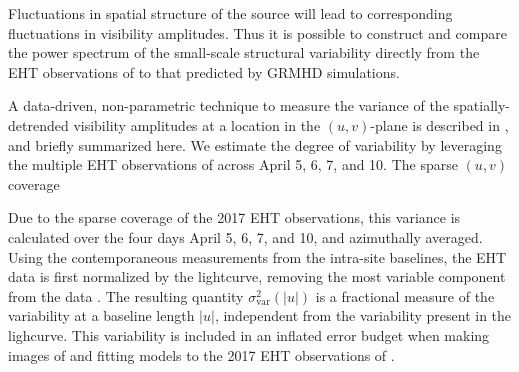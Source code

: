 

Fluctuations in spatial structure of the source will lead to corresponding fluctuations in visibility amplitudes. Thus it is possible to construct and compare the power spectrum of the small-scale structural variability directly from the EHT observations of \sgra to that predicted by GRMHD simulations.

A data-driven, non-parametric technique to measure the variance of the spatially-detrended visibility amplitudes at a location in the $(u,v)$-plane is described in \citet{NoiseModeling}, and briefly summarized here.  We estimate the degree of variability by leveraging the multiple EHT observations of \sgra across April 5, 6, 7, and 10.  The sparse $(u,v)$ coverage 

Due to the sparse coverage of the 2017 EHT observations, this variance is calculated over the four days April 5, 6, 7, and 10, and azimuthally averaged. Using the contemporaneous measurements from the intra-site baselines, the EHT data is first normalized by the lightcurve, removing the most variable component from the data \citep{NoiseModeling,Georgiev_2022}. The resulting quantity $\sigma_\text{var}^2 (|u|)$ is a fractional measure of the variability at a baseline length $|u|$, independent from the variability present in the lighcurve. This variability is included in an inflated error budget when making images of and fitting models to the 2017 EHT observations of \sgra {}. 

